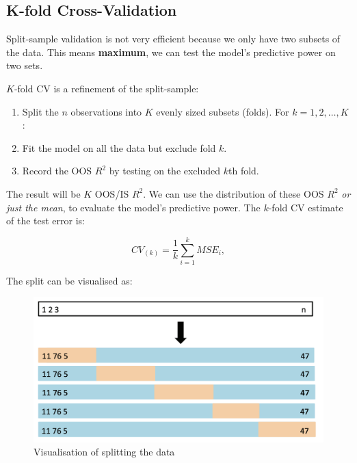 \documentclass[11pt]{article}
\begin{document}
\subsection{K-fold Cross-Validation}

Split-sample validation is not very efficient because we only have two subsets of the data. This means \textbf{maximum}, we can test the model's predictive power on two sets.

$K$-fold CV is a refinement of the split-sample:

\begin{procedure}
    \begin{enumerate}
        \item Split the $n$ observations into $K$ evenly sized subsets (folds). For $k = 1,2,\ldots, K$:
        \item Fit the model on all the data but exclude fold $k$.
        \item Record the OOS $R^2$ by testing on the excluded $k$th fold.
    \end{enumerate}
\end{procedure}

The result will be $K$ OOS/IS $R^2$. We can use the distribution of these OOS $R^2$ \textit{or just the mean}, to evaluate the model's predictive power. The $k$-fold CV estimate of the test error is:

\begin{equation}
    \label{eq:kfold}
    CV_{(k)} = \dfrac{1}{k} \sum_{i=1}^k MSE_i,
\end{equation}

The split can be visualised as:

\begin{figure}[h]
    \centering
    \includegraphics[width = \textwidth]{pic/kfold.png}
    \caption{Visualisation of splitting the data}
    \label{fig:kfold split}
\end{figure}
\end{document}
